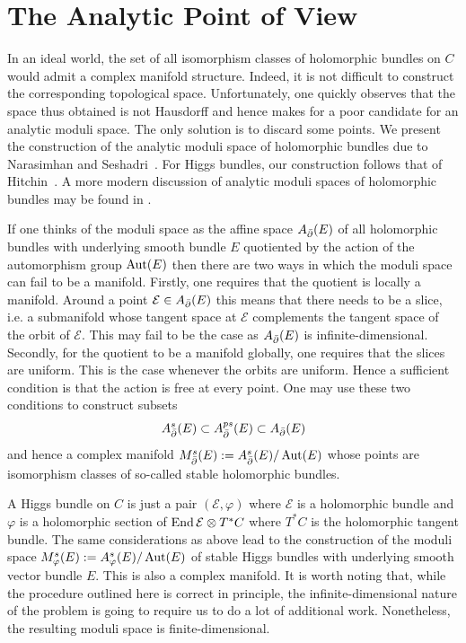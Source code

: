 \documentclass[12pt]{ociamthesis}  %
\begin{document}
\section{The Analytic Point of View}

In an ideal world, the set of all isomorphism classes of holomorphic bundles
on $C$ would admit a complex manifold structure. Indeed, it is not difficult
to construct the corresponding topological space. Unfortunately, one
quickly observes that the space thus obtained is not Hausdorff and hence
makes for a poor candidate for an analytic moduli space.
The only solution is to discard some points. We present
the construction of the analytic moduli space of holomorphic bundles
due to Narasimhan and Seshadri~\cite{ns1964}. For Higgs bundles, our
construction follows that of Hitchin~\cite{hitchin1987}.
A more modern discussion of analytic moduli spaces of holomorphic
bundles may be found in \cite{kobayashi1987}.

If one thinks of the moduli space as the affine space $A_{{\bar{\partial}}}(E)$
of all holomorphic bundles with underlying smooth bundle $E$ quotiented
by the action of the automorphism group $\operatorname{Aut}(E)$ then there are two ways in which
the moduli space can fail to be a manifold. Firstly, one requires that
the quotient is locally a manifold. Around a point $\mathcal E\in A_{\bar{\partial}}(E)$
this means that there needs to be a slice, i.e. a submanifold whose
tangent space at $\mathcal E$ complements the tangent space of the orbit
of $\mathcal E$. This may fail to be the case as $A_{\bar{\partial}}(E)$ is
infinite-dimensional. Secondly, for the quotient to be a manifold
globally, one requires that the slices are uniform. This is the case
whenever the orbits are uniform. Hence a sufficient condition is that
the action is free at every point.
One may use these two conditions to construct subsets
\begin{align*}
  A^s_{\bar{\partial}}(E) \subset A^{ps}_{\bar{\partial}}(E) \subset A_{\bar{\partial}}(E)
\end{align*}
and hence a complex manifold $M_{\bar{\partial}}^s(E) := A^s_{\bar{\partial}}(E) / \operatorname{Aut}(E)$
whose points are isomorphism classes of so-called stable
holomorphic bundles.

A Higgs bundle on $C$ is just a pair $(\mathcal E,\varphi)$
where $\mathcal E$ is a holomorphic bundle and $\varphi$ is a
holomorphic section of $\operatorname{End}\mathcal E\otimes T^*C$ where $T^*C$ is the
holomorphic tangent bundle. The same considerations as above lead to
the construction of the moduli space $M^s_\varphi(E) := A^s_\varphi(E)/\operatorname{Aut}(E)$
of stable Higgs bundles with underlying smooth vector bundle $E$. This is also a
complex manifold. It is worth noting that, while the procedure outlined
here is correct in principle, the infinite-dimensional nature of the
problem is going to require us to do a lot of additional work.
Nonetheless, the resulting moduli space is finite-dimensional.
\end{document}
